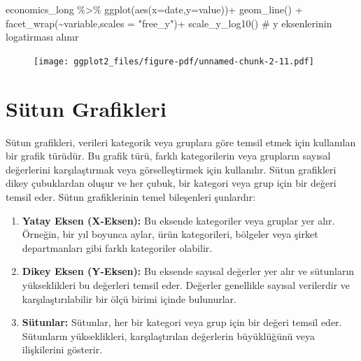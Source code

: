 \documentclass[
  letterpaper,
  DIV=11,
  numbers=noendperiod]{scrreprt}
\newenvironment{Shaded}{\begin{snugshade}}{\end{snugshade}}
\newcommand{\AttributeTok}[1]{\textcolor[rgb]{0.40,0.45,0.13}{#1}}
\newcommand{\CommentTok}[1]{\textcolor[rgb]{0.37,0.37,0.37}{#1}}
\newcommand{\FunctionTok}[1]{\textcolor[rgb]{0.28,0.35,0.67}{#1}}
\newcommand{\NormalTok}[1]{\textcolor[rgb]{0.00,0.23,0.31}{#1}}
\newcommand{\SpecialCharTok}[1]{\textcolor[rgb]{0.37,0.37,0.37}{#1}}
\newcommand{\StringTok}[1]{\textcolor[rgb]{0.13,0.47,0.30}{#1}}
\begin{document}
\begin{Shaded}
\begin{Highlighting}[]
\NormalTok{economics\_long }\SpecialCharTok{\%\textgreater{}\%} 
  \FunctionTok{ggplot}\NormalTok{(}\FunctionTok{aes}\NormalTok{(}\AttributeTok{x=}\NormalTok{date,}\AttributeTok{y=}\NormalTok{value))}\SpecialCharTok{+}
  \FunctionTok{geom\_line}\NormalTok{() }\SpecialCharTok{+}
  \FunctionTok{facet\_wrap}\NormalTok{(}\SpecialCharTok{\textasciitilde{}}\NormalTok{variable,}\AttributeTok{scales =} \StringTok{"free\_y"}\NormalTok{)}\SpecialCharTok{+}
  \FunctionTok{scale\_y\_log10}\NormalTok{() }\CommentTok{\# y eksenlerinin logatirması alınır}
\end{Highlighting}
\end{Shaded}

\begin{figure}[H]

{\centering \texttt{[image: ggplot2\_files/figure-pdf/unnamed-chunk-2-11.pdf]}

}

\end{figure}

\hypertarget{suxfctun-grafikleri}{%
\section*{Sütun Grafikleri}\label{suxfctun-grafikleri}}


Sütun grafikleri, verileri kategorik veya gruplara göre temsil etmek
için kullanılan bir grafik türüdür. Bu grafik türü, farklı kategorilerin
veya grupların sayısal değerlerini karşılaştırmak veya görselleştirmek
için kullanılır. Sütun grafikleri dikey çubuklardan oluşur ve her çubuk,
bir kategori veya grup için bir değeri temsil eder. Sütun grafiklerinin
temel bileşenleri şunlardır:

\begin{enumerate}
\def\labelenumi{\arabic{enumi}.}
\item
  \textbf{Yatay Eksen (X-Eksen):} Bu eksende kategoriler veya gruplar
  yer alır. Örneğin, bir yıl boyunca aylar, ürün kategorileri, bölgeler
  veya şirket departmanları gibi farklı kategoriler olabilir.
\item
  \textbf{Dikey Eksen (Y-Eksen):} Bu eksende sayısal değerler yer alır
  ve sütunların yükseklikleri bu değerleri temsil eder. Değerler
  genellikle sayısal verilerdir ve karşılaştırılabilir bir ölçü birimi
  içinde bulunurlar.
\item
  \textbf{Sütunlar:} Sütunlar, her bir kategori veya grup için bir
  değeri temsil eder. Sütunların yükseklikleri, karşılaştırılan
  değerlerin büyüklüğünü veya ilişkilerini gösterir.
\end{enumerate}
\end{document}

